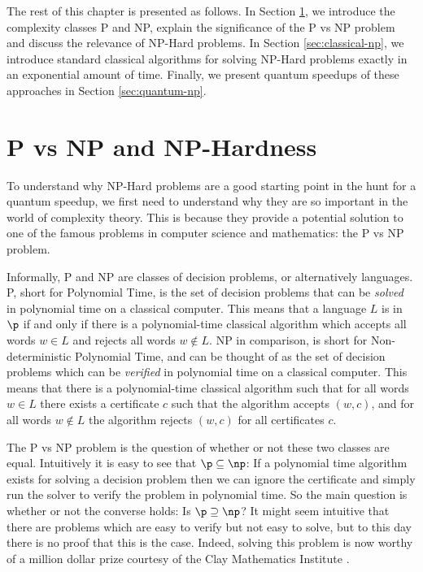 The rest of this chapter is presented as follows. In Section \ref{sec:p-vs-np}, we introduce the complexity classes P and NP, explain the significance of the P vs NP problem and discuss the relevance of NP-Hard problems. In Section \ref{sec:classical-np}, we introduce standard classical algorithms for solving NP-Hard problems exactly in an exponential amount of time. Finally, we present quantum speedups of these approaches in Section \ref{sec:quantum-np}.

\section{P vs NP and NP-Hardness}
\label{sec:p-vs-np}

To understand why NP-Hard problems are a good starting point in the hunt for a quantum speedup, we first need to understand why they are so important in the world of complexity theory. This is because they provide a potential solution to one of the famous problems in computer science and mathematics: the P vs NP problem.

Informally, P and NP are classes of decision problems, or alternatively languages. P, short for Polynomial Time, is the set of decision problems that can be \textit{solved} in polynomial time on a classical computer. This means that a language $L $ is in $ \p$ if and only if there is a polynomial-time classical algorithm which accepts all words $w \in L$ and rejects all words $w \notin L$. NP in comparison, is short for Non-deterministic Polynomial Time, and can be thought of as the set of decision problems which can be \textit{verified} in polynomial time on a classical computer. This means that there is a polynomial-time classical algorithm such that for all words $w \in L$ there exists a certificate $c$ such that the algorithm accepts $(w,c)$, and for all words $w \notin L$ the algorithm rejects $(w,c)$ for all certificates $c$.

The P vs NP problem is the question of whether or not these two classes are equal. Intuitively it is easy to see that $\p \subseteq \np$: If a polynomial time algorithm exists for solving a decision problem then we can ignore the certificate and simply run the solver to verify the problem in polynomial time. So the main question is whether or not the converse holds: Is $\p \supseteq \np$? It might seem intuitive that there are problems which are easy to verify but not easy to solve, but to this day there is no proof that this is the case. Indeed, solving this problem is now worthy of a million dollar prize courtesy of the Clay Mathematics Institute \cite{cmipvsnp}.

